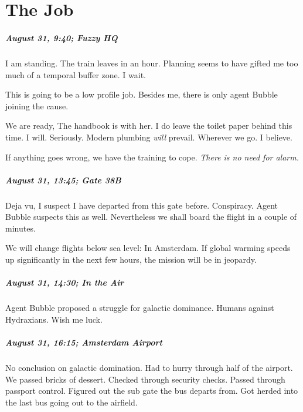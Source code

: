 \chapter{The Job}


\paragraph{August 31, 9:40; Fuzzy HQ}
I am standing.
The train leaves in an hour.
Planning seems to have gifted me too much of a temporal buffer zone.
I wait.

This is going to be a low profile job.
Besides me, there is only agent Bubble joining the cause.

We are ready, The handbook is with her.
I do leave the toilet paper behind this time.
I will.
Seriously.
Modern plumbing \emph{will} prevail.
Wherever we go.
I believe.

If anything goes wrong, we have the training to cope.
\emph{There is no need for alarm.}

\paragraph{August 31, 13:45; Gate 38B}
Deja vu, I suspect I have departed from this gate before.
Conspiracy.
Agent Bubble suspects this as well.
Nevertheless we shall board the flight in a couple of minutes.

We will change flights below sea level: In Amsterdam.
If global warming speeds up significantly in the next few hours, the mission will be in jeopardy.

\paragraph{August 31, 14:30; In the Air}
Agent Bubble proposed a struggle for galactic dominance.
Humans against Hydraxians.
Wish me luck.

\paragraph{August 31, 16:15; Amsterdam Airport}
No conclusion on galactic domination.
Had to hurry through half of the airport.
We passed bricks of dessert.
Checked through security checks.
Passed through passport control.
Figured out the sub gate the bus departs from.
Got herded into the last bus going out to the airfield.

